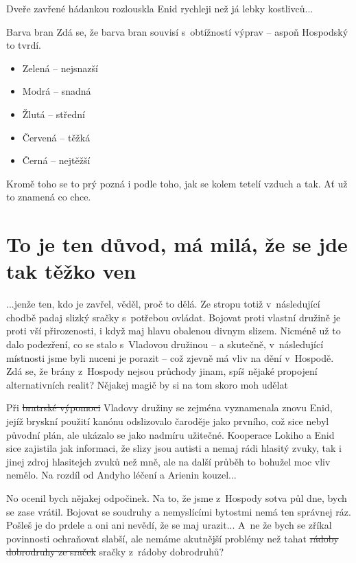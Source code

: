 \documentclass[a4paper,twocolumn,openany,nodeprecatedcode, justified]{dndbook}
\newcommand{\bi}{\begin{itemize}}
\newcommand{\ei}{\end{itemize}}
\begin{document}
	Dveře zavřené hádankou rozlouskla Enid rychleji než já lebky kostlivců...
	
	
	
	\begin{DndSidebar}{Barva bran}
		\sffamily
		Zdá se, že barva bran souvisí s~obtížností výprav -- aspoň Hospodský to tvrdí.
		\bi
			\item Zelená -- nejsnazší
			\item Modrá -- snadná
			\item Žlutá -- střední
			\item Červená -- těžká
			\item Černá -- nejtěžší
		\ei
		Kromě toho se to prý pozná i podle toho, jak se kolem tetelí vzduch a tak. Ať už to znamená co chce.
	\end{DndSidebar}
	
	\section[Sezení 2]{To je ten důvod, má milá, že se jde tak těžko ven}
	...jenže ten, kdo je zavřel, věděl, proč to dělá. Ze stropu totiž v~následující chodbě padaj slizký sračky s~potřebou ovládat. Bojovat proti vlastní družině je proti vší přirozenosti, i když maj hlavu obalenou divnym slizem. Nicméně už to dalo podezření, co se stalo s~Vladovou družinou -- a skutečně, v~následující místnosti jsme byli nuceni je porazit -- což zjevně má vliv na dění v~Hospodě. Zdá se, že brány z~Hospody nejsou průchody jinam, spíš nějaké propojení alternativních realit? Nějakej magič by si na tom skoro moh udělat 
	
	Při \sout{bratrské výpomoci}  Vladovy družiny se zejména vyznamenala znovu Enid, jejíž bryskní použití kanónu odslizovalo čaroděje jako prvního, což sice nebyl původní plán, ale ukázalo se jako nadmíru užitečné. Kooperace Lokiho a Enid sice zajistila jak informaci, že slizy jsou autisti a nemaj rádi hlasitý zvuky, tak i jinej zdroj hlasitejch zvuků než mně, ale na další průběh to bohužel moc vliv nemělo. Na rozdíl od Andyho léčení a Arienin kouzel...
	
	No ocenil bych nějakej odpočinek. Na to, že jsme z~Hospody sotva půl dne, bych se zase vrátil. Bojovat se soudruhy a nemyslícími bytostmi nemá ten správnej ráz. Pošleš je do prdele a oni ani nevědí, že se maj urazit... A~ne že bych se zříkal povinnosti ochraňovat slabší, ale nemáme akutnější problémy než tahat \sout{rádoby dobrodruhy ze sraček} sračky z~rádoby dobrodruhů?
	
\end{document}
